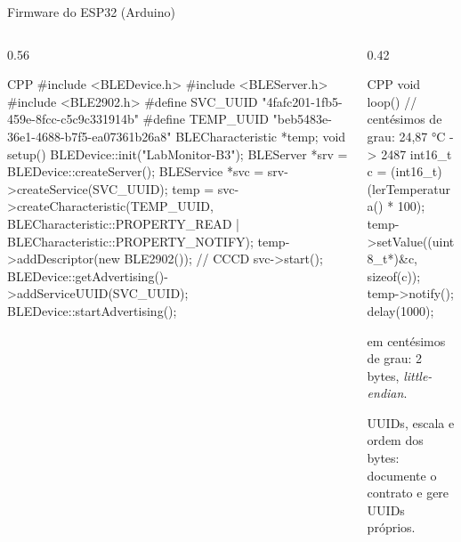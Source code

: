 \documentclass[aspectratio=169,10pt]{beamer}
\begin{document}
\begin{frame}[fragile]{Firmware do ESP32 (Arduino)}
  \begin{columns}[T]
    \begin{column}{0.56\textwidth}
\begin{codigo}[title=labmonitor\_ble.ino --- configuração]{CPP}
#include <BLEDevice.h>
#include <BLEServer.h>
#include <BLE2902.h>
#define SVC_UUID  "4fafc201-1fb5-459e-8fcc-c5c9c331914b"
#define TEMP_UUID "beb5483e-36e1-4688-b7f5-ea07361b26a8"
BLECharacteristic *temp;
void setup() {
  BLEDevice::init("LabMonitor-B3");
  BLEServer *srv = BLEDevice::createServer();
  BLEService *svc = srv->createService(SVC_UUID);
  temp = svc->createCharacteristic(TEMP_UUID,
    BLECharacteristic::PROPERTY_READ |
    BLECharacteristic::PROPERTY_NOTIFY);
  temp->addDescriptor(new BLE2902());   // CCCD
  svc->start();
  BLEDevice::getAdvertising()->addServiceUUID(SVC_UUID);
  BLEDevice::startAdvertising();
}
\end{codigo}
    \end{column}
    \begin{column}{0.42\textwidth}
\begin{codigo}[title=--- laço principal]{CPP}
void loop() {
  // centésimos de grau: 24,87 °C -> 2487
  int16_t c = (int16_t)(lerTemperatura() * 100);
  temp->setValue((uint8_t*)&c, sizeof(c));
  temp->notify();
  delay(1000);
}
\end{codigo}
      \begin{conceito}
         em centésimos de grau: 2 bytes, \emph{little-endian}.
      \end{conceito}
      \begin{atencao}[Contrato]
        UUIDs, escala e ordem dos bytes: documente o contrato e gere UUIDs próprios.
      \end{atencao}
    \end{column}
  \end{columns}
\end{frame}
\end{document}
